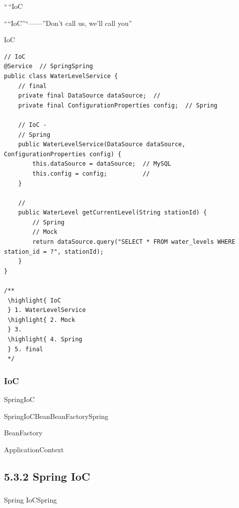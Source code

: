 ``\,``IoC

````IoC''``------''Don't call us, we'll
call you''

IoC

\begin{lstlisting}[style=java]
// IoC
@Service  // SpringSpring
public class WaterLevelService {
    // final
    private final DataSource dataSource;  // 
    private final ConfigurationProperties config;  // Spring
    
    // IoC - 
    // Spring
    public WaterLevelService(DataSource dataSource, ConfigurationProperties config) {
        this.dataSource = dataSource;  // MySQL
        this.config = config;          // 
    }
    
    // 
    public WaterLevel getCurrentLevel(String stationId) {
        // Spring
        // Mock
        return dataSource.query("SELECT * FROM water_levels WHERE station_id = ?", stationId);
    }
}

/**
 \highlight{ IoC
 } 1. WaterLevelService
 \highlight{ 2. Mock
 } 3. 
 \highlight{ 4. Spring
 } 5. final
 */
\end{lstlisting}

\hypertarget{ioc}{%
\subsubsection{IoC}\label{ioc}}

SpringIoC

SpringIoC\important{}BeanBeanFactorySpring

BeanFactory

ApplicationContext

\hypertarget{spring-ioc}{%
\subsection{5.3.2 Spring IoC}\label{spring-ioc}}

\hypertarget{section-49}{%
\subsubsection{}\label{section-49}}

Spring IoCSpring


